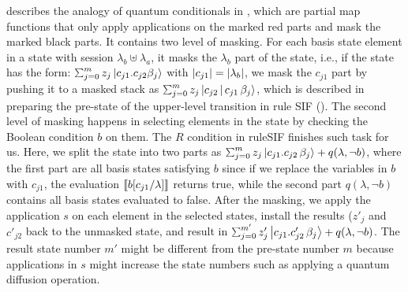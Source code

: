 \label{sec:conditionals}
 describes the analogy of quantum conditionals in \qafny, which are partial map functions that only apply applications on the marked red parts and mask the marked black parts.
It contains two level of masking. For each basis state element in a state with session $\lambda_b\uplus \lambda_a$, it masks the $\lambda_b$ part of the state, i.e., if the state has the form: $\sch{m}{z_j}{c_{j1}.c_{j2}\beta_j}$ with $|c_{j1}| = |\lambda_b|$, we mask the $c_{j1}$ part by pushing it to a masked stack as $\sch{m}{z_j}{c_{j2}\,|\,c_{j1}\,\beta_j}$, which is described in preparing the pre-state of the upper-level transition in rule \textsc{SIF} ().
The second level of masking happens in selecting elements in the state by checking the Boolean condition $b$ on them.
The $R$ condition in rule\textsc{SIF} finishes such task for us.
Here, we split the state into two parts as $\sch{m}{z_j}{c_{j1}.c_{j2}\,\beta_j}+q(\lambda,\neg b)$, where the first part are all basis states satisfying $b$ since if we replace the variables in $b$ with $c_{j1}$, the evaluation $\llbracket b[c_{j1}/\lambda] \rrbracket$ returns true, while the second part $q(\lambda,\neg b)$ contains all basis states evaluated to false.
After the masking, we apply the application $s$ on each element in the selected states, install the results ($z'_j$ and $c'_{j2}$ back to the unmasked state, and result in $\sch{m'}{z'_j}{c_{j1}.c'_{j2}\,\beta_j}+q(\lambda,\neg b)$.
The result state number $m'$ might be different from the pre-state number $m$ because applications in $s$ might increase the state numbers such as applying a quantum diffusion operation.

